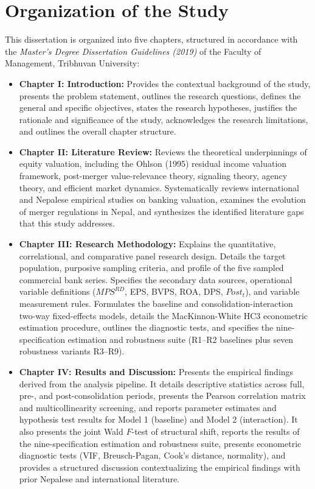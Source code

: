 \section{Organization of the Study}
\label{sec:organization}

This dissertation is organized into five chapters, structured in accordance with the \textit{Master's Degree Dissertation Guidelines (2019)} of the Faculty of Management, Tribhuvan University:

\begin{itemize}
\item \textbf{Chapter I: Introduction:} Provides the contextual background of the study, presents the problem statement, outlines the research questions, defines the general and specific objectives, states the research hypotheses, justifies the rationale and significance of the study, acknowledges the research limitations, and outlines the overall chapter structure.
\item \textbf{Chapter II: Literature Review:} Reviews the theoretical underpinnings of equity valuation, including the Ohlson (1995) residual income valuation framework, post-merger value-relevance theory, signaling theory, agency theory, and efficient market dynamics. Systematically reviews international and Nepalese empirical studies on banking valuation, examines the evolution of merger regulations in Nepal, and synthesizes the identified literature gaps that this study addresses.
\item \textbf{Chapter III: Research Methodology:} Explains the quantitative, correlational, and comparative panel research design. Details the target population, purposive sampling criteria, and profile of the five sampled commercial bank series. Specifies the secondary data sources, operational variable definitions ($\mathit{MPS}^{RD}$, EPS, BVPS, ROA, DPS, $\mathit{Post}_t$), and variable measurement rules. Formulates the baseline and consolidation-interaction two-way fixed-effects models, details the MacKinnon-White HC3 econometric estimation procedure, outlines the diagnostic tests, and specifies the nine-specification estimation and robustness suite (R1--R2 baselines plus seven robustness variants R3--R9).
\item \textbf{Chapter IV: Results and Discussion:} Presents the empirical findings derived from the analysis pipeline. It details descriptive statistics across full, pre-, and post-consolidation periods, presents the Pearson correlation matrix and multicollinearity screening, and reports parameter estimates and hypothesis test results for Model 1 (baseline) and Model 2 (interaction). It also presents the joint Wald $F$-test of structural shift, reports the results of the nine-specification estimation and robustness suite, presents econometric diagnostic tests (VIF, Breusch-Pagan, Cook's distance, normality), and provides a structured discussion contextualizing the empirical findings with prior Nepalese and international literature.

\end{itemize}
